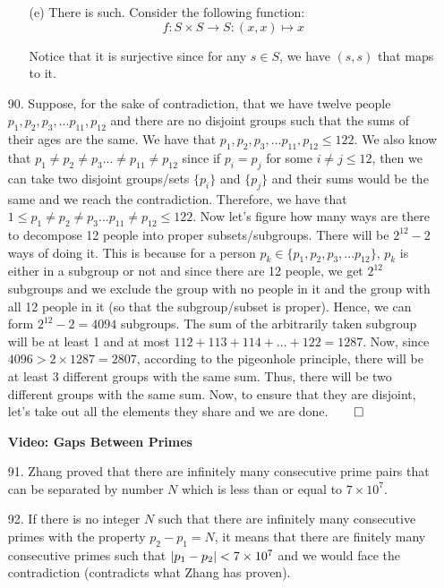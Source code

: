 \documentclass[12pt, a4paper]{article}
\DeclarePairedDelimiter\abs{\lvert}{\rvert}
\newcommand{\rarr}{\rightarrow}
\begin{document}
\begin{itemize}
\begin{itemize}
\item[]

\item[(e)]
There is such. Consider the following function:
$$f : S \times S \rarr S : (x, x) \mapsto x$$

Notice that it is surjective since for any $s \in S$, we have
$(s, s)$ that maps to it.
\end{itemize}

\newpage

\item[90.]
Suppose, for the sake of contradiction, that we have twelve people $p_1, p_2, p_3, ... p_{11}, p_{12}$ and
there are no disjoint groups such that the sums of their ages are the same. 
We have that $p_1, p_2, p_3, ... p_{11}, p_{12} \leq 122$. We also know that
$p_1 \neq p_2 \neq p_3 ... \neq p_{11} \neq p_{12}$ since if $p_i = p_j$ for some $i \neq j \leq 12$,
then we can take two disjoint groups/sets $\{p_i\}$ and $\{p_j\}$ and their sums would be the same and we reach the contradiction.
Therefore, we have that $1 \leq p_1 \neq p_2 \neq p_3 ... p_{11} \neq p_{12} \leq 122$. Now let's figure
how many ways are there to decompose 12 people into proper subsets/subgroups. There will be $2^{12} - 2$ ways of doing it.
This is because for a person $p_k \in \{p_1, p_2, p_3, ... p_12\}$, $p_k$ is either in a subgroup or not and since there are 12 people,
we get $2^{12}$ subgroups and we exclude the group with no people in it and the group with all 12 people in it (so that the subgroup/subset is proper).
Hence, we can form $2^{12} - 2 = 4094$ subgroups. The sum of the arbitrarily taken subgroup will be at least 1 and at most $112 + 113 + 114 + ... + 122 = 1287$.
Now, since $4096 > 2 \times 1287 = 2807$, according to the pigeonhole principle, there will be at least 3 different groups with the same sum. Thus, there will be
two different groups with the same sum. Now, to ensure that they are disjoint, let's take out all the elements they share and we are done.$\qed$


\item[]
\item[]

{\Large \textbf{Video: Gaps Between Primes}}

\item[91.]
Zhang proved that there are infinitely many consecutive prime pairs that can be separated by number $N$ which is less than or equal to $7 \times 10^7$.

\item[92.]
If there is no integer $N$ such that there are infinitely many consecutive primes with the property $p_2 - p_1 = N$,
it means that there are finitely many consecutive primes such that $\abs{p_1 - p_2} < 7 \times 10^7$ and
we would face the contradiction (contradicts what Zhang has proven).


\end{itemize}
\end{document}
